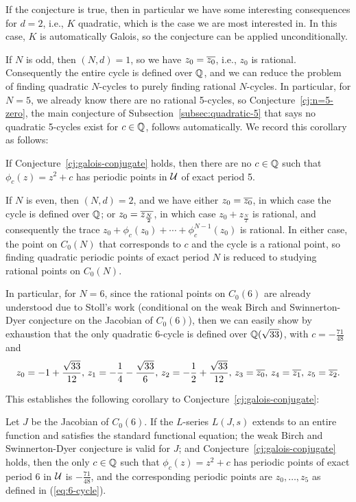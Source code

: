 If the conjecture is true, then in particular we have some interesting
consequences for $d = 2$, i.e., $K$ quadratic, which is the case we
are most interested in. In this case, $K$ is automatically Galois, so
the conjecture can be applied unconditionally.

If $N$ is odd, then $(N, d) = 1$, so we have $z_0 = \overline{z_0}$, i.e.,
$z_0$ is rational. Consequently the entire cycle is defined over $\mathbb{Q}$,
and we can reduce the problem of finding quadratic $N$-cycles to
purely finding rational $N$-cycles. In particular, for $N = 5$, we
already know there are no rational 5-cycles, so
Conjecture~\ref{cj:n=5-zero}, the main conjecture of
Subsection~\ref{subsec:quadratic-5} that says no quadratic 5-cycles
exist for $c \in \mathbb{Q}$, follows automatically. We record this corollary
as follows:

\begin{corollary}
  If Conjecture~\ref{cj:galois-conjugate} holds, then there are no $c
  \in \mathbb{Q}$ such that $\phi_c(z) = z^2 + c$ has periodic points in $\mathcal{U}$
  of exact period 5.
\end{corollary}

If $N$ is even, then $(N, d) = 2$, and we have either $z_0 =
\overline{z_0}$, in which case the cycle is defined over $\mathbb{Q}$; or $z_0 =
\overline{z_{\frac{N}{2}}}$, in which case $z_0 + z_{\frac{N}{2}}$ is
rational, and consequently the trace $z_0 + \phi_c(z_0) + \cdots +
\phi_c^{N-1}(z_0)$ is rational. In either case, the point on $C_0(N)$
that corresponds to $c$ and the cycle is a rational point, so finding
quadratic periodic points of exact period $N$ is reduced to studying
rational points on $C_0(N)$.

In particular, for $N = 6$, since the rational points on $C_0(6)$ are
already understood due to Stoll's work \cite{MR2465796} (conditional
on the weak Birch and Swinnerton-Dyer conjecture on the Jacobian of
$C_0(6)$), then we can easily show by exhaustion that the only
quadratic 6-cycle is defined over $\mathbb{Q}(\sqrt{33})$, with $c =
-\frac{71}{48}$ and
\begin{equation}
  \label{eq:6-cycle}
  z_0 = -1 + \frac{\sqrt{33}}{12},\,
  z_1 = -\frac{1}{4} - \frac{\sqrt{33}}{6},\,
  z_2 = -\frac{1}{2} + \frac{\sqrt{33}}{12},\,
  z_3 = \overline{z_0},\,
  z_4 = \overline{z_1},\,
  z_5 = \overline{z_2}.
\end{equation}

This establishes the following corollary to
Conjecture~\ref{cj:galois-conjugate}:

\begin{corollary}
  \label{cor:6-cycle}
  Let $J$ be the Jacobian of $C_0(6)$. If the $L$-series $L(J, s)$
  extends to an entire function and satisfies the standard functional
  equation; the weak Birch and Swinnerton-Dyer conjecture is valid for
  $J$; and Conjecture~\ref{cj:galois-conjugate} holds, then the only
  $c \in \mathbb{Q}$ such that $\phi_c(z) = z^2 + c$ has periodic points of
  exact period 6 in $\mathcal{U}$ is $-\frac{71}{48}$, and the corresponding
  periodic points are $z_0, \dots, z_5$ as defined in
  (\ref{eq:6-cycle}).
\end{corollary}

